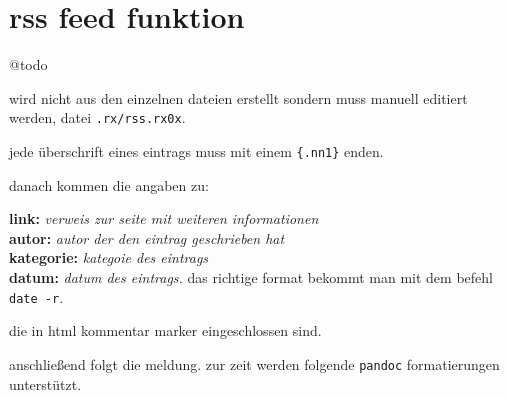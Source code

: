 
\section{rss feed funktion}\label{rss-feed-funktion}

@todo

wird nicht aus den einzelnen dateien erstellt sondern muss manuell
editiert werden, datei \texttt{.rx/rss.rx0x}.

jede überschrift eines eintrags muss mit einem \texttt{\{.nn1\}} enden.

danach kommen die angaben zu:

\textbf{link:} \emph{verweis zur seite mit weiteren
informationen}\\\textbf{autor:} \emph{autor der den eintrag geschrieben
hat}\\\textbf{kategorie:} \emph{kategoie des eintrags}\\\textbf{datum:}
\emph{datum des eintrags.} das richtige format bekommt man mit dem
befehl \texttt{date -r}.

die in html kommentar marker eingeschlossen sind.

anschließend folgt die meldung. zur zeit werden folgende \texttt{pandoc}
formatierungen unterstützt.

